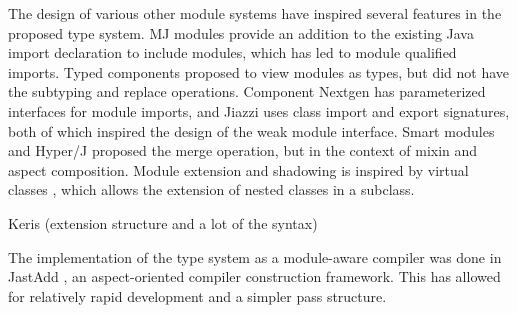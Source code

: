 The design of various other module systems have inspired several features in the 
proposed type system. MJ modules \cite{corwinMJModules} provide an addition to
the existing Java import declaration to include modules, which has led to module
qualified imports. Typed components \cite{secotypedcomponents} proposed to
view modules as types, but did not have the subtyping and replace operations.
Component Nextgen \cite{componentnextgen} has parameterized interfaces for module imports,
and Jiazzi \cite{mcdirmid01jiazzi} uses class import and export signatures, 
both of which inspired the design of the weak module interface. Smart modules
\cite{Ancona05smartmodules} and Hyper/J \cite{hyperj} proposed the merge operation, 
but in the context of mixin and aspect composition. Module extension and shadowing is inspired by 
virtual classes \cite{virtualclasses89}, which allows the extension of nested classes in a subclass.

\cite{keris05} Keris (extension structure and a lot of the syntax)

The implementation of the type system as a module-aware compiler was done in JastAdd \cite{jastadd},
an aspect-oriented compiler construction framework. This has allowed for relatively
rapid development and a simpler pass structure.